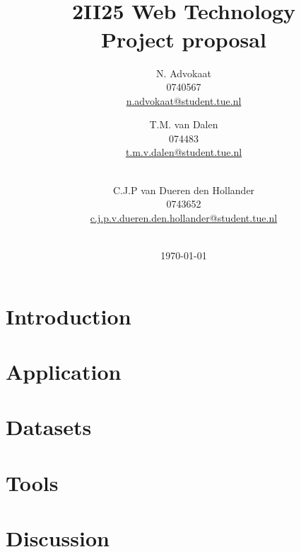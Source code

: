 \documentclass[a4paper,11pt]{article}
\title{
	\HRule\\[0.6cm]
	{\Huge \bfseries 2II25 Web Technology}\\
	{\huge Project proposal}
	\HRule\\[0.4cm]
}
\author{
	N. Advokaat\\
	0740567\\
	\href{mailto:n.advokaat@student.tue.nl}{n.advokaat@student.tue.nl}
	\and
	T.M. van Dalen\\
	074483\\
	\href{mailto:t.m.v.dalen@student.tue.nl}{t.m.v.dalen@student.tue.nl}
	\and
	\\[0.5cm]
	C.J.P van Dueren den Hollander\\
	0743652\\
	\href{mailto:c.j.p.v.dueren.den.hollander@student.tue.nl}{c.j.p.v.dueren.den.hollander@student.tue.nl}\\
	\\[0.5cm]
}
\date{\today}
\begin{document}
	\maketitle
	\thispagestyle{empty}

	\newpage

	\section{Introduction}
	\label{sec:intro}
	

	\section{Application}
	\label{sec:application}
	

	\section{Datasets}
	\label{sec:datasets}
	

	\section{Tools}
	\label{sec:tools}
	

	\section{Discussion}
	\label{sec:discussion}
	
\end{document}
